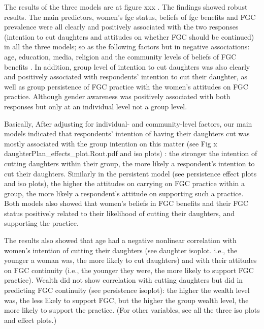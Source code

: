 \documentclass[12pt,]{article}
\begin{document}

The results of the three models are at figure xxx .  The findings showed robust results.  The main predictors, women’s fgc status, beliefs of fgc benefits and FGC prevalence were all clearly and positively associated with the two responses (intention to cut daughters and attitudes on whether FGC should be continued) in all the three models; so as the following factors but in negative associations:  age, education, media, religion and the community levels of beliefs of FGC benefits .  In addition, group level of intention to cut daughters was also clearly and positively associated with respondents’ intention to cut their daughter, as well as group persistence of FGC practice with the women’s attitudes on FGC practice.   Although gender awareness was positively associated with both responses but only at an individual level not a group level.

Basically, After adjusting for individual- and community-level factors, our main models indicated that respondents’ intention of having their daughters cut was mostly associated with the group intention on this matter (see Fig x daughterPlan_effects_plot.Rout.pdf and iso plots) :  the stronger the intention of cutting daughters within their group, the more likely a respondent’s intention to cut their daughters.  Similarly in the persistent model (see persistence effect plots and iso plots), the higher the attitudes on carrying on FGC practice within a group, the more likely a respondent’s attitude on supporting such a practice.  Both models also showed that women’s beliefs in FGC benefits and their FGC status positively related to their likelihood of cutting their daughters, and supporting the practice.

The results also showed that age had a negative nonlinear correlation with women’s intention of cutting their daughters (see daughter isoplot.  i.e., the younger a woman was, the more likely to cut daughters) and with their attitudes on FGC continuity (i.e., the younger they were,  the more likely to support FGC practice).  Wealth did not show correlation with cutting daughters but did in predicting FGC continuity (see persistence isoplot):  the higher the wealth level was, the less likely to support FGC, but the higher the group wealth level, the more likely to support the practice.  (For other variables, see all the three iso plots and effect plots.)
\end{document}
